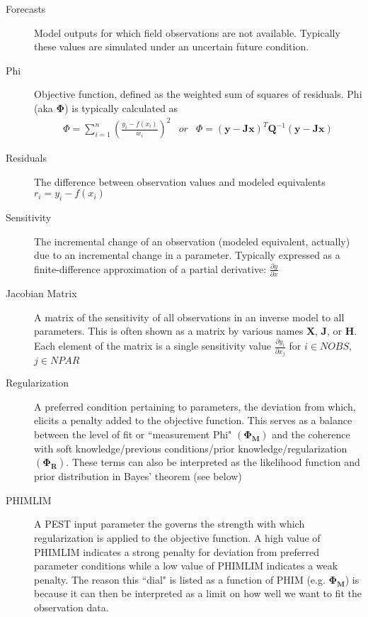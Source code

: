 \documentclass[english]{article}
\begin{document}
\begin{description}
\begin{enumerate}
\end{enumerate}
\item [Forecasts] Model outputs for which field observations are not available. Typically these values are simulated under an uncertain future condition.
\item [Phi] Objective function, defined as the weighted sum of squares of residuals. Phi (aka $\mathbf{\Phi}$) is typically calculated as
\begin{equation}
\begin{array}{ccc}
 \Phi=\sum_{i=1}^{n}\left(\frac{y_{i}-f\left(x_{i}\right)}{w_{i}}\right)^{2} & or & \Phi=\left(\mathbf{y}-\mathbf{Jx}\right)^{T}\mathbf{Q}^{-1}\left(\mathbf{y}-\mathbf{Jx}\right)
 \end{array}
\end{equation}
\item [Residuals] The difference between observation values and modeled equivalents $r_i=y_i-f\left(x_i\right)$
\item [Sensitivity] The incremental change of an observation (modeled equivalent, actually) due to an incremental change in a parameter. Typically expressed as a finite-difference approximation of a partial derivative: $\frac{\partial y}{\partial x}$
\item [Jacobian Matrix] A matrix of the sensitivity of all observations in an inverse model to all parameters. This is often shown as a matrix by various names $\mathbf{X}$, $\mathbf{J}$, or $\mathbf{H}$. Each element of the matrix is a single sensitivity value  $\frac{\partial y_i}{\partial x_j}$ for $i\in NOBS$, $j \in NPAR$
\item [Regularization] A preferred condition pertaining to parameters, the deviation from which, elicits a penalty added to the objective function. This serves as a balance between the level of fit or ``measurement Phi"  $(\mathbf{\Phi_M})$ and the coherence with soft knowledge/previous conditions/prior knowledge/regularization $(\mathbf{\Phi_R})$. These terms can also be interpreted as the likelihood function and prior distribution in Bayes' theorem (see below) 
\item [PHIMLIM] A PEST input parameter the governs the strength with which regularization is applied to the objective function. A high value of PHIMLIM indicates a strong penalty for deviation from preferred parameter conditions while a low value of PHIMLIM indicates a weak penalty. The reason this ``dial" is listed as a function of PHIM (e.g. $\mathbf{\Phi_M}$) is because it can then be interpreted as a limit on how well we want to fit the observation data.

\end{description}
\end{document}

